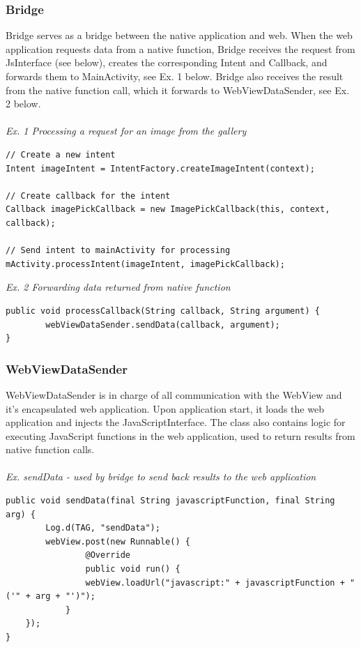 \subsubsection{Bridge} 
Bridge serves as a bridge between the native application and web. When the web application requests data from a native function, Bridge receives the request from JsInterface (see below), creates the corresponding Intent and Callback, and forwards them to MainActivity, see Ex. 1 below. Bridge also receives the result from the native function call, which it forwards to WebViewDataSender, see Ex. 2 below.
\\\\
\emph{Ex. 1 Processing a request for an image from the gallery}
\begin{lstlisting}
// Create a new intent
Intent imageIntent = IntentFactory.createImageIntent(context);

// Create callback for the intent
Callback imagePickCallback = new ImagePickCallback(this, context, callback);

// Send intent to mainActivity for processing
mActivity.processIntent(imageIntent, imagePickCallback);
\end{lstlisting}

\emph{Ex. 2 Forwarding data returned from native function}
\begin{lstlisting}
public void processCallback(String callback, String argument) {
        webViewDataSender.sendData(callback, argument);
}
\end{lstlisting}
	
\subsubsection{WebViewDataSender}
WebViewDataSender is in charge of all communication with the WebView and it's encapsulated web application. Upon application start, it loads the web application and injects the JavaScriptInterface. The class also contains logic for executing JavaScript functions in the web application, used to return results from native function calls.
\\\\
\emph{Ex. sendData - used by bridge to send back results to the web application}
\begin{lstlisting}
public void sendData(final String javascriptFunction, final String arg) {
        Log.d(TAG, "sendData");
        webView.post(new Runnable() {
            	@Override
            	public void run() {
        		webView.loadUrl("javascript:" + javascriptFunction + "('" + arg + "')");
    		}
	});
}
\end{lstlisting}
	
